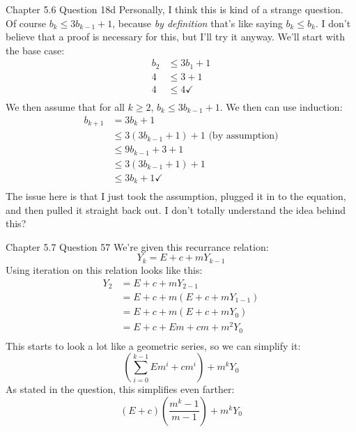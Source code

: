 \documentclass[11pt]{article}
\begin{document}
    \begin{problem}{Chapter 5.6 Question 18d}
        Personally, I think this is kind of a strange question. Of course $b_k \leq 3b_{k-1} + 1$,
        because \textit{by definition} that's like saying $b_k \leq b_k$. I don't believe that a
        proof is necessary for this, but I'll try it anyway. We'll start with the base case:
        \begin{equation*}
            \begin{split}
                b_2 & \leq 3b_1 + 1 \\
                4 & \leq 3 + 1 \\
                4 & \leq 4 \checkmark \\
            \end{split}
        \end{equation*}
        We then assume that for all $k \geq 2$, $b_k \leq 3b_{k-1} + 1$. We then can use induction:
        \begin{equation*}
            \begin{split}
                b_{k+1} & = 3b_k + 1 \\
                & \leq 3(3b_{k-1} + 1) + 1 \text{ (by assumption)} \\
                & \leq 9b_{k-1} + 3 + 1 \\
                & \leq 3(3b_{k-1} + 1) + 1 \\
                & \leq 3b_k + 1 \checkmark \\
            \end{split}
        \end{equation*}
        The issue here is that I just took the assumption, plugged it in to the equation, and then pulled it
        straight back out. I don't totally understand the idea behind this?
    \end{problem}

    \begin{problem}{Chapter 5.7 Question 57}
        We're given this recurrance relation:
        \[Y_k = E + c + mY_{k-1}\]
        Using iteration on this relation looks like this:
        \begin{equation*}
            \begin{split}
                Y_2 & = E + c + mY_{2-1} \\
                & = E + c + m(E + c + mY_{1-1}) \\
                & = E + c + m(E + c + mY_0) \\
                & = E + c + Em + cm + m^2Y_0 \\
            \end{split}
        \end{equation*}
        This starts to look a lot like a geometric series, so we can simplify it:
        \[(\sum_{i=0}^{k-1} Em^i + cm^i) + m^{k}Y_0\]
        As stated in the question, this simplifies even farther:
        \[(E + c)(\frac{m^k - 1}{m - 1}) + m^{k}Y_0\]
    \end{problem}
\end{document}

